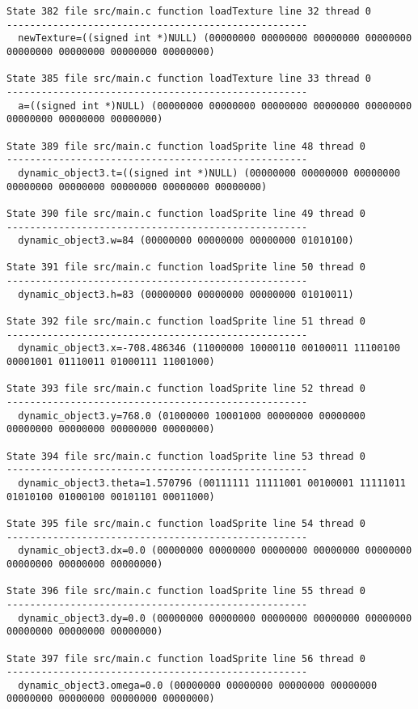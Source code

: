 \begin{verbatim}
State 382 file src/main.c function loadTexture line 32 thread 0
----------------------------------------------------
  newTexture=((signed int *)NULL) (00000000 00000000 00000000 00000000 00000000 00000000 00000000 00000000)

State 385 file src/main.c function loadTexture line 33 thread 0
----------------------------------------------------
  a=((signed int *)NULL) (00000000 00000000 00000000 00000000 00000000 00000000 00000000 00000000)

State 389 file src/main.c function loadSprite line 48 thread 0
----------------------------------------------------
  dynamic_object3.t=((signed int *)NULL) (00000000 00000000 00000000 00000000 00000000 00000000 00000000 00000000)

State 390 file src/main.c function loadSprite line 49 thread 0
----------------------------------------------------
  dynamic_object3.w=84 (00000000 00000000 00000000 01010100)

State 391 file src/main.c function loadSprite line 50 thread 0
----------------------------------------------------
  dynamic_object3.h=83 (00000000 00000000 00000000 01010011)

State 392 file src/main.c function loadSprite line 51 thread 0
----------------------------------------------------
  dynamic_object3.x=-708.486346 (11000000 10000110 00100011 11100100 00001001 01110011 01000111 11001000)

State 393 file src/main.c function loadSprite line 52 thread 0
----------------------------------------------------
  dynamic_object3.y=768.0 (01000000 10001000 00000000 00000000 00000000 00000000 00000000 00000000)

State 394 file src/main.c function loadSprite line 53 thread 0
----------------------------------------------------
  dynamic_object3.theta=1.570796 (00111111 11111001 00100001 11111011 01010100 01000100 00101101 00011000)

State 395 file src/main.c function loadSprite line 54 thread 0
----------------------------------------------------
  dynamic_object3.dx=0.0 (00000000 00000000 00000000 00000000 00000000 00000000 00000000 00000000)

State 396 file src/main.c function loadSprite line 55 thread 0
----------------------------------------------------
  dynamic_object3.dy=0.0 (00000000 00000000 00000000 00000000 00000000 00000000 00000000 00000000)

State 397 file src/main.c function loadSprite line 56 thread 0
----------------------------------------------------
  dynamic_object3.omega=0.0 (00000000 00000000 00000000 00000000 00000000 00000000 00000000 00000000)


\end{verbatim}
